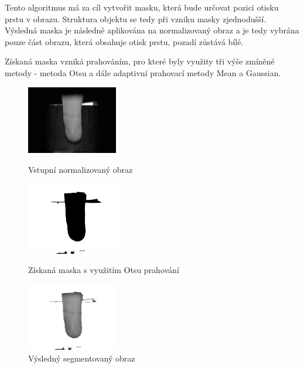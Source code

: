 Tento algoritmus má za cíl vytvořit masku, která bude určovat pozici otisku prstu v obrazu. Struktura objektu se tedy při vzniku masky zjednodušší. Výsledná maska je následně aplikována na normalizovaný obraz a je tedy vybrána pouze část obrazu, která obsahuje otisk prstu, pozadí zůstává bílé.

Získaná maska vzniká prahováním, pro které byly využity tři výše zmíněné metody - metoda Otsu a dále adaptivní prahovací metody Mean a Gaussian.

\begin{figure}[!htbp]
  \begin{minipage}[b]{0.3\linewidth}
    \centering
    \includegraphics[width=150px]{obrazky-figures/live104norm.png}
    \caption{Vstupní normalizovaný obraz}
  \end{minipage}
  \hspace{0.55cm}
  \begin{minipage}[b]{0.3\linewidth}
    \centering
    \includegraphics[width=160px]{obrazky-figures/live104mask.png}
    \caption{Získaná maska s využitím Otsu prahování}
  \end{minipage}
  \hspace{0.3cm}
    \begin{minipage}[b]{0.3\linewidth}
    \centering
    \includegraphics[width=150px]{obrazky-figures/live104segotsu.png}
    \caption{Výsledný segmentovaný obraz}
  \end{minipage}
\end{figure}


